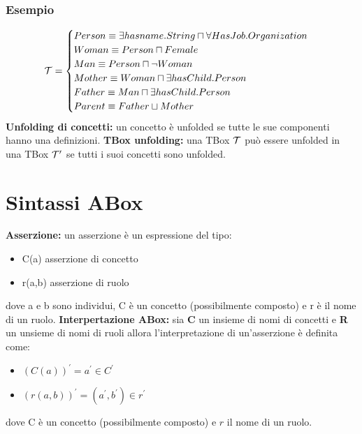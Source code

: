 \documentclass[../main.tex]{subfiles}
\begin{document}
   \subsubsection{Esempio}
   \begin{equation*}
      \mathcal{T}=
      \begin{cases}
         Person \equiv \exists hasname.String \sqcap \forall HasJob.Organization\\
         Woman \equiv Person \sqcap  Female\\
         Man \equiv Person \sqcap  \lnot Woman\\
         Mother \equiv Woman \sqcap  \exists hasChild.Person\\
         Father \equiv Man \sqcap  \exists hasChild.Person\\
         Parent \equiv Father \sqcup Mother
      \end{cases}
   \end{equation*}
   \spazio
   \textbf{Unfolding di concetti:} un concetto è unfolded se tutte le sue componenti hanno una definizioni.
   \spazio
   \textbf{TBox unfolding:} una TBox $\mathcal{T}$ può essere unfolded in una TBox $\mathcal{T}^\prime$ se tutti i suoi concetti sono unfolded.

   \section{Sintassi ABox}
   \textbf{Asserzione:} un asserzione è un espressione del tipo:
   \begin{itemize}
      \item C(a) asserzione di concetto
      \item r(a,b) asserzione di ruolo
   \end{itemize}
   dove a e b sono individui, C è un concetto (possibilmente composto) e r è il nome di un ruolo.
   \spazio
   \textbf{Interpertazione ABox:} sia \textbf{C} un insieme di nomi di concetti e \textbf{R} un unsieme di nomi di ruoli allora l'interpretazione di un'asserzione è definita come:
   \begin{itemize}
      \item $(C(a))^\prime = a^\prime \in C^\prime$
      \item $(r(a, b))^\prime = (a^\prime,b^\prime) \in r^\prime$
   \end{itemize}
   dove C è un concetto (possibilmente composto) e $r$ il nome di un ruolo.
\end{document}
